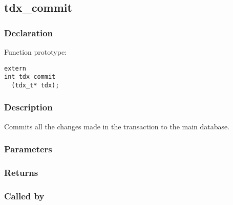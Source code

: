 
\newpage
\subsection{tdx\_commit}
\subsubsection{Declaration} Function prototype:

\begin{verbatim}
extern
int tdx_commit
  (tdx_t* tdx);
\end{verbatim}

\subsubsection{Description}


 Commits all the changes made in the transaction to the main database.
 

\subsubsection{Parameters}
\subsubsection{Returns}
\subsubsection{Called by}
